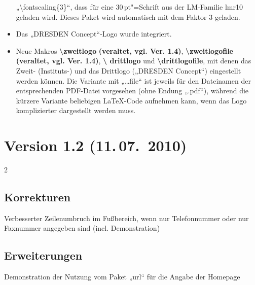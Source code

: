 \documentclass[serifmath,a0paper,noDIN,MathematikA0]{tudmathposter}
\begin{document}
\begin{multicols}
\begin{itemize}
  „\textbackslash fontscaling\{3\}“, dass für eine $30$\,pt"=Schrift
  aus der LM-Familie lmr10 geladen wird. Dieses Paket wird automatisch
  mit dem Faktor 3 geladen.
\item Das „DRESDEN Concept“-Logo wurde integriert.
\item Neue Makros \textbf{\textbackslash zweitlogo} \textbf{(veraltet,
    vgl. Ver. 1.4)},
  \textbf{\textbackslash zweitlogofile} \textbf{(veraltet,
    vgl. Ver. 1.4)}, \textbf{\textbackslash
    drittlogo} und \textbf{\textbackslash drittlogofile}, mit denen
  das Zweit- (Instituts-) und das Drittlogo („DRESDEN Concept“)
  eingestellt werden können. Die Variante mit „\dots file“ ist jeweils
  für den Dateinamen der entsprechenden PDF-Datei vorgesehen (ohne
  Endung „.pdf“), während die kürzere Variante beliebigen LaTeX-Code
  aufnehmen kann, wenn das Logo komplizierter dargestellt werden muss.
\end{itemize}
\end{multicols}
\section{Version 1.2 (11.\,07.~2010)}
\begin{multicols}2
\subsection{Korrekturen}
Verbesserter Zeilenumbruch im Fußbereich, wenn nur Telefonnummer oder nur Faxnummer angegeben sind (incl. Demonstration)
\subsection{Erweiterungen}
Demonstration der Nutzung vom Paket „url“ für die Angabe der Homepage
\end{multicols}
\end{document}
